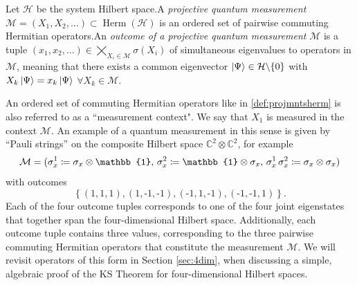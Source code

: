 \begin{definition}
\label{def:projmntsherm}
Let $\mathcal{H}$ be the system Hilbert space.\hfill\break A \emph{projective quantum measurement} $\mathcal{M}=(X_{1},X_{2},\dots)\subset\operatorname{Herm}(\mathcal{H})$ is an ordered set of pairwise commuting Hermitian operators.\hfill\break An \emph{outcome of a projective quantum measurement} $\mathcal{M}$ is a tuple\hfill\break 
$\left(x_{1},x_{2},\dots\right)\in\bigtimes_{X_{i}\in\mathcal{M}}\sigma(X_{i})$ of simultaneous eigenvalues to operators in $\mathcal{M}$, meaning that there exists a common eigenvector $\ket{\Psi} \in\mathcal{H}\backslash\{0\}$ with $X_{k}\ket{\Psi} =x_{k}\ket{\Psi}$  $\forall X_{k}\in\mathcal{M}$.
\end{definition}

An ordered set of commuting Hermitian operators like in \ref{def:projmntsherm} is also referred to as a ``measurement context". We say that $X_1$ is measured in the context $\mathcal{M}$. An example of a quantum measurement in this sense is given by “Pauli strings” on the composite Hilbert space $\mathbb{\mathbb{C}}^{2}\otimes\mathbb{C}^{2}$, for example
\begin{equation*}
\mathcal{M} =(\sigma_{x}^{1} \coloneqq \sigma_{x}\otimes
\mathbb{1},\thinspace\sigma_{x}^{2}\coloneqq\mathbb{1}\otimes\sigma_{x},\thinspace\sigma_{x}^{1}\,\sigma_{x}^{2}\coloneqq\sigma_{x}\otimes\sigma_{x})
\end{equation*} with outcomes
\begin{equation*}
\left\{ (1,1,1),(1,\text{-}1,\text{-}1),(\text{-}1,1,\text{-}1),(\text{-}1,\text{-}1,1)\right\}.
\end{equation*}
Each of the four outcome tuples corresponds to one of the four joint eigenstates that together span the four-dimensional Hilbert space. Additionally, each outcome tuple contains three values, corresponding to the three pairwise commuting Hermitian operators that constitute the measurement $\mathcal{M}$. We will revisit operators of this form in Section \ref{sec:4dim}, when discussing a simple, algebraic proof of the KS Theorem for four-dimensional Hilbert spaces.

